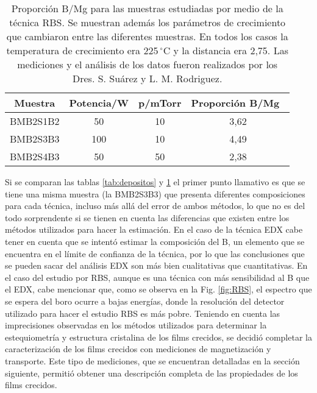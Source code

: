 \begin{table}[h!]
  \centering
  \begin{tabular}{|c|c|c|c|}\hline
	Muestra	& Potencia/W & p/mTorr & Proporción B/Mg\ \\ \hline
	BMB2S1B2 & 50 & 10 & 3,62 \\
	BMB2S3B3 & 100 & 10 & 4,49 \\
	BMB2S4B3 & 50 & 50 &  2,38 \\ \hline
  \end{tabular}
  \caption[Proporción B/Mg para las muestras estudiadas por medio de la técnica RBS.]{Proporción B/Mg para las muestras estudiadas por medio de la técnica RBS. Se muestran además los parámetros de crecimiento que cambiaron entre las diferentes muestras. En todos los casos la temperatura de crecimiento era 225\,$^{\circ}$C y la distancia era 2,75. Las mediciones y el análisis de los datos fueron realizados por los Dres. S. Suárez y L. M. Rodriguez.}
  \label{tab:composicionRBS}
\end{table}

Si se comparan las tablas \ref{tab:depositos} y \ref{tab:composicionRBS} el primer punto llamativo es que se tiene una misma muestra (la BMB2S3B3) que presenta diferentes composiciones para cada técnica, incluso más allá del error de ambos métodos, lo que no es del todo sorprendente si se tienen en cuenta las diferencias que existen entre los métodos utilizados para hacer la estimación. En el caso de la técnica EDX cabe tener en cuenta que se intentó estimar la composición del B, un elemento que se encuentra en el límite de confianza de la técnica, por lo que las conclusiones que se pueden sacar del análisis EDX son más bien cualitativas que cuantitativas. En el caso del estudio por RBS, aunque es una técnica con más sensibilidad al B que el EDX, cabe mencionar que, como se observa en la Fig. \ref{fig:RBS}, el espectro que se espera del boro ocurre a bajas energías, donde la resolución del detector utilizado para hacer el estudio RBS es más pobre.
\newpage
Teniendo en cuenta las imprecisiones observadas en los métodos utilizados para determinar la estequiometría y estructura cristalina de los films crecidos, se decidió completar la caracterización de los films crecidos con mediciones de magnetización y transporte. Este tipo de mediciones, que se encuentran detalladas en la sección siguiente, permitió obtener una descripción completa de las propiedades de los films crecidos.
